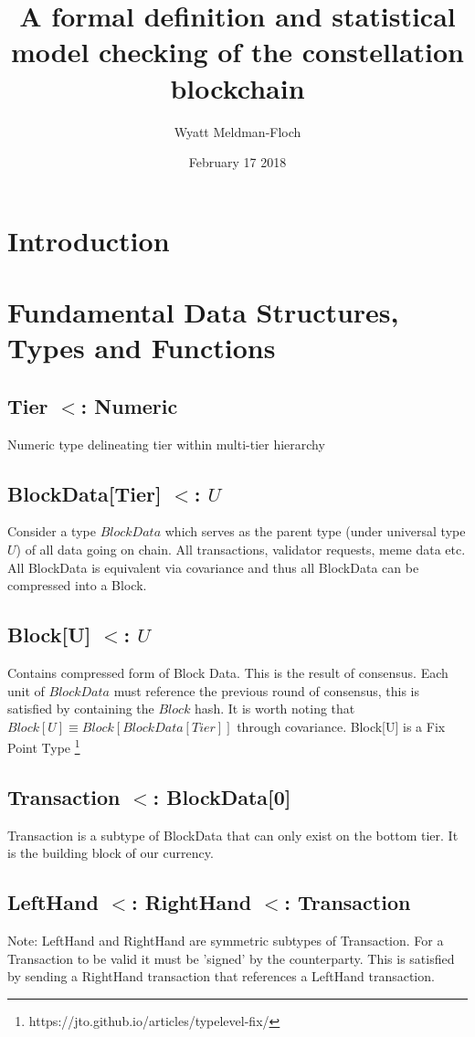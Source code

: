 \documentclass{article}
\title{A formal definition and statistical model checking of the constellation blockchain}
\author{Wyatt Meldman-Floch}
\date{February 17 2018}
\begin{document}
\maketitle

\begin{abstract}


\end{abstract}
\setcounter{secnumdepth}{0}
\section{Introduction}

\section{Fundamental Data Structures, Types and Functions}
\subsection{Tier $<$: Numeric}
Numeric type delineating tier within multi-tier hierarchy

\subsection{BlockData[Tier] $<$: $U$}
Consider a type $BlockData$ which serves as the parent type (under universal type $U$) of all data going on chain. All transactions, validator requests, meme data etc. All BlockData is equivalent via covariance and thus all BlockData can be compressed into a Block.

\subsection{Block[U] $<$: $U$}
Contains compressed form of Block Data. This is the result of consensus. Each unit of $BlockData$ must reference the previous round of consensus, this is satisfied by containing the $Block$ hash. It is worth noting that $Block[U] \equiv Block[BlockData[Tier]]$ through covariance. Block[U] is a Fix Point Type \footnote{https://jto.github.io/articles/typelevel-fix/}

\subsection{Transaction $<$: BlockData[0]}
Transaction is a subtype of BlockData that can only exist on the bottom tier. It is the building block of our currency.

\subsection{LeftHand $<$: RightHand $<$: Transaction}
Note: LeftHand and RightHand are symmetric subtypes of Transaction. For a Transaction to be valid it must be 'signed' by the counterparty. This is satisfied by sending a RightHand transaction that references a LeftHand transaction.
\end{document}
